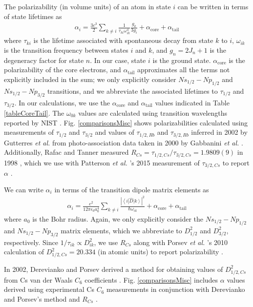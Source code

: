 \documentclass[twocolumn,prl,showpacs,superscriptaddress]{revtex4-1}   %
\newcommand{\brakett}[3]{\left\langle #1 \right|#2\left| #3 \right\rangle}
\newcommand{\figref}[1]{Fig. \ref{#1}}
\newcommand{\acore}{\alpha_{\textrm{core}}}
\newcommand{\atail}{\alpha_{\textrm{tail}}}
\newcommand{\etal}{\textit{et al. }}
\begin{document}
The polarizability (in volume units) of an atom in state $i$ can be written in terms of state lifetimes as
\begin{align}
	\alpha_i = \frac{3c^3}{2} \sum_{k\neq i} 
	\frac{1}{\tau_{ki} \omega_{ik}^4} \frac{g_k}{3g_i}
	+ \acore
	+ \atail
	\label{polFromLifetimes}
\end{align}
where $\tau_{ki}$ is the lifetime associated with spontaneous decay from state $k$ to $i$, $\omega_{ik}$ is the transition frequency between states $i$ and $k$, and $g_n = 2J_n+1$ is the degeneracy factor for state $n$. In our case, state $i$ is the ground state. $\acore$ is the polarizability of the core electrons, and $\atail$ approximates all the terms not explicitly included in the sum; we only explicitly consider $Ns_{1/2}-Np_{1/2}$ and $Ns_{1/2}-Np_{3/2}$ transitions, and we abbreviate the associated lifetimes to $\tau_{1/2}$ and $\tau_{3/2}$.
In our calculations, we use the $\acore$ and $\atail$ values indicated in Table \ref{tableCoreTail}.
The $\omega_{0k}$ values are calculated using transition wavelengths reported by NIST \cite{NIST}. 
\figref{comparisonsMisc} shows polarizabilities calculated using measurements of $\tau_{1/2}$ and $\tau_{3/2}$
\cite{Young1994,Rafac1999,Bouloufa2007,Volz2006,Simsarian1998,Wang1997}
and values of $\tau_{1/2,Rb}$ and $\tau_{3/2,Rb}$ inferred in 2002 by Gutterres \etal from photo-association data taken in 2000 by Gabbanini \etal \cite{Gabbanini2000,Gutterres2002}.
 Additionally, Rafac and Tanner measured $R_{Cs} = \tau_{1/2,Cs}/\tau_{3/2,Cs} = 1.9809(9)$ in 1998 \cite{Rafac1998}, which we use with Patterson \etal's 2015 measurement of $\tau_{3/2,Cs}$ to report $\alpha$ \cite{Patterson2015}.

We can write $\alpha_i$ in terms of the transition dipole matrix elements as
\begin{align}
	\alpha_i = \frac{e^2}{12 \pi \epsilon_0 a_0^4} \sum_{k\neq i}	
	\frac{\left|\brakett{i}{\hat{D}}{k}\right|^2}{\hbar\omega_{ik}}	
	+ \acore
	+ \atail
	\label{polFromMatrixElements}
\end{align}
where $a_0$ is the Bohr radius. 
Again, we only explicitly consider the $Ns_{1/2}-Np_{1/2}$ and $Ns_{1/2}-Np_{3/2}$ matrix elements, 
which we abbreviate to $D_{1/2}^2$ and $D_{3/2}^2$, respectively. 
Since $1/\tau_{ik} \propto D_{ik}^2$,
we use $R_{Cs}$ along with Porsev \etal's 2010 calculation of $D_{1/2,Cs}^2 = 20.334$ (in atomic units) to report polarizability \cite{Rafac1998,Porsev2010}.

In 2002, Derevianko and Porsev derived a method for obtaining values of $D_{1/2,Cs}^2$ from Cs van der Waals $C_6$ coefficients \cite{Derevianko2001}. \figref{comparisonsMisc} includes $\alpha$ values derived using experimental Cs $C_6$ measurements in conjunction with Derevianko and Porsev's method and $R_{Cs}$ \cite{Leo2000,Chin2004,Derevianko2001,Rafac1998}.
\end{document}
